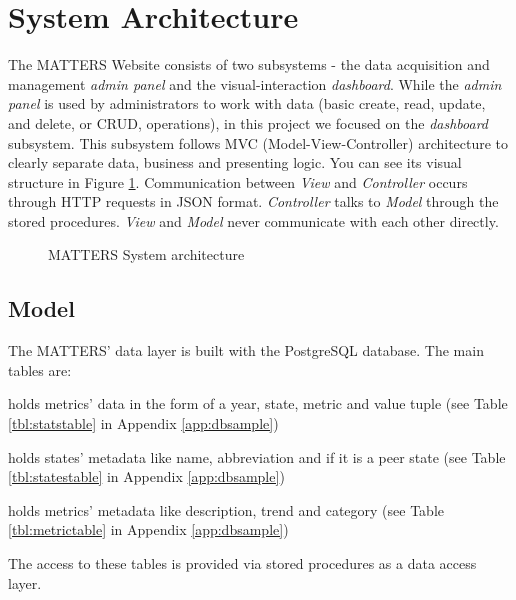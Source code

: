 	\section{System Architecture}
	
		The MATTERS Website consists of two subsystems - the data acquisition 
		and management \emph{admin panel} and the visual-interaction 
		\emph{dashboard}. While the \emph{admin panel} is used by administrators
		to work with data (basic create, read, update, and delete, or CRUD, 
		operations), in this project we focused on the \emph{dashboard} 
		subsystem. This subsystem follows MVC (Model-View-Controller) 
		architecture to clearly separate data, business and presenting logic.
		You can see its visual structure in Figure \ref{fig:sysarch}. 
		Communication between \emph{View} and \emph{Controller} occurs through 
		HTTP requests in JSON format. \emph{Controller} talks to \emph{Model} 
		through the stored procedures. \emph{View} and \emph{Model} never 
		communicate with each other directly.
		
		\begin{figure}[t]
			\centering
			
			\caption{MATTERS System architecture}
			\label{fig:sysarch}
		\end{figure}
		
		
		\subsection{Model}
			
			The MATTERS' data layer is built with the PostgreSQL database. The 
			main tables are:
			
			\begin{description}[itemsep=-1.5mm, align=right,labelwidth=3cm]
				\item [Statistics]
					holds metrics' data in the form of a year, state, metric and 
					value tuple (see Table \ref{tbl:statstable} in Appendix \ref{app:dbsample})
				\item [States]
					holds states' metadata like name, abbreviation and if it is 
					a peer state (see Table \ref{tbl:statestable} in Appendix \ref{app:dbsample})
				\item [Metrics]
					holds metrics' metadata like description, trend and 
					category (see Table \ref{tbl:metrictable} in Appendix \ref{app:dbsample})
			\end{description}
			
			The access to these tables is provided via stored procedures as a 
			data access layer.
			
